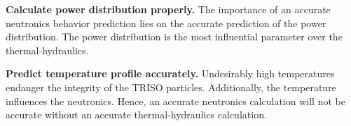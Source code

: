 \documentclass[11pt,letterpaper]{article}
\begin{document}
\textbf{Calculate power distribution properly.}
The importance of an accurate neutronics behavior prediction lies on the accurate prediction of the power distribution.
The power distribution is the most influential parameter over the thermal-hydraulics.

\textbf{Predict temperature profile accurately.}
Undesirably high temperatures endanger the integrity of the TRISO particles.
Additionally, the temperature influences the neutronics.
Hence, an accurate neutronics calculation will not be accurate without an accurate thermal-hydraulics calculation.















\pagebreak


\end{document}
